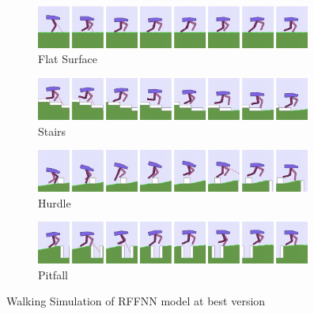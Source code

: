 \begin{figure}
	\centering
	\begin{subfigure}{.9\textwidth}
		\centering
		\includegraphics[width=0.99\textwidth]{figures/bipedal/anim/ff_flat.png}
		\caption{Flat Surface}
		\label{fig:anim_rffnn_flat}
	\end{subfigure}
	\begin{subfigure}{.9\textwidth}
		\centering
		\includegraphics[width=0.99\textwidth]{figures/bipedal/anim/ff_stairs.png}
		\caption{Stairs}
		\label{fig:anim_rffnn_stairs}
	\end{subfigure}
	\begin{subfigure}{.9\textwidth}
		\centering
		\includegraphics[width=0.99\textwidth]{figures/bipedal/anim/ff_hurdle.png}
		\caption{Hurdle}
		\label{fig:anim_rffnn_hurdle}
	\end{subfigure}
	\begin{subfigure}{.9\textwidth}
		\centering
		\includegraphics[width=0.99\textwidth]{figures/bipedal/anim/ff_pitfall.png}
		\caption{Pitfall}
		\label{fig:anim_rffnn_pitfall}
	\end{subfigure}
	\caption{Walking Simulation of RFFNN model at best version}
	\label{fig:rffnn_simulation}
\end{figure}

